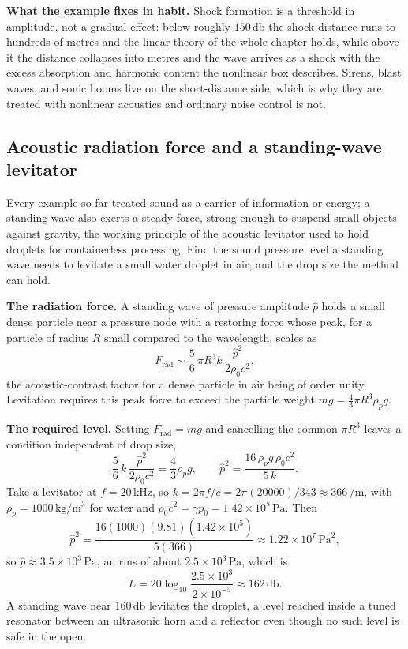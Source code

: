 \textbf{What the example fixes in habit.} Shock formation is a threshold in
amplitude, not a gradual effect: below roughly $150\,\si{\decibel}$ the
shock distance runs to hundreds of metres and the linear theory of the whole
chapter holds, while above it the distance collapses into metres and the
wave arrives as a shock with the excess absorption and harmonic content the
nonlinear box describes. Sirens, blast waves, and sonic booms live on the
short-distance side, which is why they are treated with nonlinear acoustics
and ordinary noise control is not.

\subsection{Acoustic radiation force and a standing-wave levitator}

Every example so far treated sound as a carrier of information or energy; a
standing wave also exerts a steady force, strong enough to suspend small
objects against gravity, the working principle of the acoustic levitator
used to hold droplets for containerless processing. Find the sound pressure
level a standing wave needs to levitate a small water droplet in air, and
the drop size the method can hold.

\textbf{The radiation force.} A standing wave of pressure amplitude $\hat p$
holds a small dense particle near a pressure node with a restoring force
whose peak, for a particle of radius $R$ small compared to the wavelength,
scales as
\[
F_{\text{rad}} \sim \frac{5}{6}\,\pi R^3 k\,\frac{\hat p^2}{2\rho_0 c^2},
\]
the acoustic-contrast factor for a dense particle in air being of order
unity. Levitation requires this peak force to exceed the particle weight
$mg = \tfrac43\pi R^3\rho_p g$.

\textbf{The required level.} Setting $F_{\text{rad}} = mg$ and cancelling the
common $\pi R^3$ leaves a condition independent of drop size,
\[
\frac{5}{6}\,k\,\frac{\hat p^2}{2\rho_0 c^2}
   = \frac{4}{3}\rho_p g,
\qquad
\hat p^2 = \frac{16\,\rho_p g\,\rho_0 c^2}{5\,k}.
\]
Take a levitator at $f = 20\,\si{\kilo\hertz}$, so $k = 2\pi f/c =
2\pi(20000)/343 \approx 366\,\si{\per\meter}$, with $\rho_p =
1000\,\si{\kilogram\per\meter\cubed}$ for water and $\rho_0 c^2 =
\gamma p_0 = 1.42\times 10^{5}\,\si{\pascal}$. Then
\[
\hat p^2 = \frac{16(1000)(9.81)(1.42\times 10^{5})}{5(366)}
         \approx 1.22\times 10^{7}\,\si{\pascal\squared},
\]
so $\hat p\approx 3.5\times 10^{3}\,\si{\pascal}$, an rms of about
$2.5\times 10^{3}\,\si{\pascal}$, which is
\[
L = 20\log_{10}\frac{2.5\times 10^{3}}{2\times 10^{-5}}
  \approx 162\,\si{\decibel}.
\]
A standing wave near $160\,\si{\decibel}$ levitates the droplet, a level
reached inside a tuned resonator between an ultrasonic horn and a reflector
even though no such level is safe in the open.

